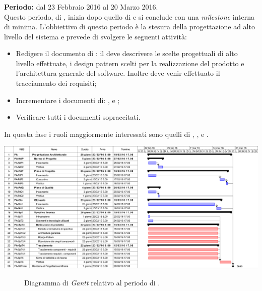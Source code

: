 \subsubsection{\PA}
\textbf{Periodo:} dal 23 Febbraio 2016 al 20 Marzo 2016. \\
Questo periodo, di \PA, inizia dopo quello di \AD e si conclude con una \textit{milestone} interna di \RdP minima. L'obbiettivo di questo periodo è la stesura della progettazione ad alto livello del sistema e prevede di svolgere le seguenti attività:
\begin{itemize}
	\item Redigere il documento di \textit{\ST}: il \textit{\Prog} deve descrivere le scelte progettuali di alto livello effettuate, i design pattern scelti per la realizzazione del prodotto e l'architettura generale del software. Inoltre deve venir effettuato il tracciamento dei requisiti;  
	\item Incrementare i documenti di: \textit{\NdP},\textit{\PdP} e \textit{\PdQ};
	\item Verificare tutti i documenti sopraccitati.
\end{itemize}
In questa fase i ruoli maggiormente interessati sono quelli di \textit{\Amm}, \textit{\Res}, \textit{\Prog} e \textit{\Ver}. 
\begin{center}
	\includegraphics[keepaspectratio = true, width=16cm]{immagini/PdP_ProgettazioneArchitetturaleGantt.png}
\end{center}
\begin{figure}[h]
	\caption{Diagramma di \textit{Gantt} relativo al periodo di \PA.}\label{etichetta}
\end{figure}

